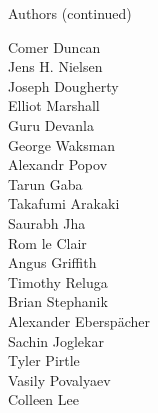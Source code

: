 \begin{frame}{Authors (continued)}
\begin{multicols}{5}
Comer Duncan\\
Jens H. Nielsen\\
Joseph Dougherty\\
Elliot Marshall\\
Guru Devanla\\
George Waksman\\
Alexandr Popov\\
Tarun Gaba\\
Takafumi Arakaki\\
Saurabh Jha\\
Rom le Clair\\
Angus Griffith\\
Timothy Reluga\\
Brian Stephanik\\
Alexander Eberspächer\\
Sachin Joglekar\\
Tyler Pirtle\\
Vasily Povalyaev\\
Colleen Lee\\
\end{multicols}
\end{frame}
